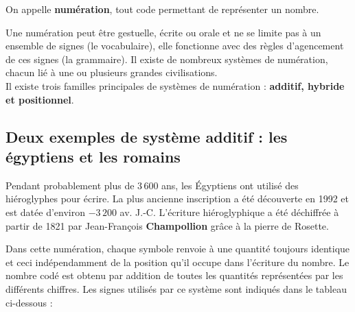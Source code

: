 \begin{definition}[Numération]
   On appelle \textbf{numération}, tout code permettant de représenter un nombre.
\end{definition}

   \medskip
   
   Une numération peut être gestuelle, écrite ou orale et ne se limite pas à un ensemble de signes (le vocabulaire), elle fonctionne avec des règles d'agencement de ces signes (la grammaire). Il existe de nombreux systèmes de numération, chacun lié à une ou plusieurs grandes civilisations. \\
   Il existe trois familles principales de systèmes de numération : {\bf additif, hybride et positionnel}.
    
    
\subsection{Deux exemples de système additif : les égyptiens et les romains} %

   Pendant probablement plus de 3\,600 ans, les Égyptiens ont utilisé des hiéroglyphes pour écrire. La plus ancienne inscription a été découverte en 1992 et est datée d'environ $-3\,200$ av. J.-C. L'écriture hiéroglyphique a été déchiffrée à partir de 1821 par Jean-François {\bf Champollion} grâce à la pierre de Rosette.

   Dans cette numération, chaque symbole renvoie à une quantité toujours identique et ceci indépendamment de la position qu'il occupe dans l'écriture du nombre. Le nombre codé est obtenu par addition de toutes les quantités représentées par les différents chiffres. Les signes utilisés par ce système sont indiqués dans le tableau ci-dessous :

